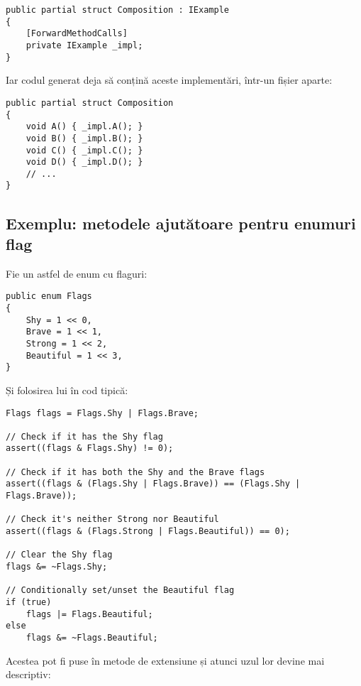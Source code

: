 \documentclass[a4paper,12pt]{report}
\begin{document}
\begin{verbatim}
public partial struct Composition : IExample
{
    [ForwardMethodCalls]
    private IExample _impl;
}
\end{verbatim}

Iar codul generat deja să conțină aceste implementări, într-un fișier aparte:

\begin{verbatim}
public partial struct Composition
{
    void A() { _impl.A(); }
    void B() { _impl.B(); }
    void C() { _impl.C(); }
    void D() { _impl.D(); }
    // ...
}
\end{verbatim}


\subsection{Exemplu: metodele ajutătoare pentru enumuri flag}

Fie un astfel de enum cu flaguri:

\begin{verbatim}
public enum Flags
{
    Shy = 1 << 0,
    Brave = 1 << 1,
    Strong = 1 << 2,
    Beautiful = 1 << 3,
}
\end{verbatim}

Și folosirea lui în cod tipică:

\begin{verbatim}
Flags flags = Flags.Shy | Flags.Brave;

// Check if it has the Shy flag
assert((flags & Flags.Shy) != 0);

// Check if it has both the Shy and the Brave flags
assert((flags & (Flags.Shy | Flags.Brave)) == (Flags.Shy | Flags.Brave));

// Check it's neither Strong nor Beautiful
assert((flags & (Flags.Strong | Flags.Beautiful)) == 0);

// Clear the Shy flag
flags &= ~Flags.Shy;

// Conditionally set/unset the Beautiful flag
if (true)
    flags |= Flags.Beautiful;
else
    flags &= ~Flags.Beautiful;
\end{verbatim}

Acestea pot fi puse în metode de extensiune și atunci uzul lor devine mai descriptiv:
\end{document}
